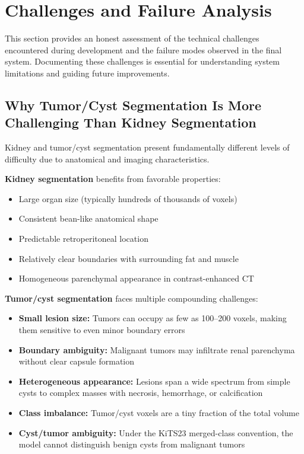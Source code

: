 \section{Challenges and Failure Analysis}

This section provides an honest assessment of the technical challenges encountered during development and the failure modes observed in the final system. Documenting these challenges is essential for understanding system limitations and guiding future improvements.

\subsection{Why Tumor/Cyst Segmentation Is More Challenging Than Kidney Segmentation}

Kidney and tumor/cyst segmentation present fundamentally different levels of difficulty due to anatomical and imaging characteristics.

\textbf{Kidney segmentation} benefits from favorable properties:
\begin{itemize}
    \item Large organ size (typically hundreds of thousands of voxels)
    \item Consistent bean-like anatomical shape
    \item Predictable retroperitoneal location
    \item Relatively clear boundaries with surrounding fat and muscle
    \item Homogeneous parenchymal appearance in contrast-enhanced CT
\end{itemize}

\textbf{Tumor/cyst segmentation} faces multiple compounding challenges:
\begin{itemize}
    \item \textbf{Small lesion size:} Tumors can occupy as few as 100--200 voxels, making them sensitive to even minor boundary errors
    \item \textbf{Boundary ambiguity:} Malignant tumors may infiltrate renal parenchyma without clear capsule formation
    \item \textbf{Heterogeneous appearance:} Lesions span a wide spectrum from simple cysts to complex masses with necrosis, hemorrhage, or calcification
    \item \textbf{Class imbalance:} Tumor/cyst voxels are a tiny fraction of the total volume
    \item \textbf{Cyst/tumor ambiguity:} Under the KiTS23 merged-class convention, the model cannot distinguish benign cysts from malignant tumors
\end{itemize}

